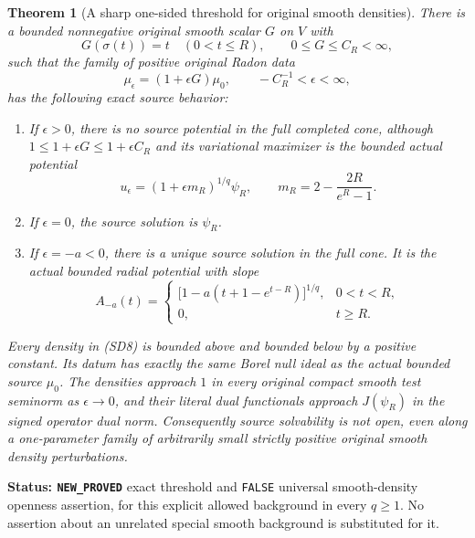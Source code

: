\documentclass[11pt,a4paper]{article}
\numberwithin{equation}{section}
\newtheorem{theorem}{Theorem}[section]
\theoremstyle{definition}
\theoremstyle{remark}
\begin{document}
\begin{theorem}[A sharp one-sided threshold for original smooth densities]
\label{thm:r12-smooth-density-one-sided-threshold}
There is a bounded nonnegative original smooth scalar
$G$ on $V$ with
\[
                 G(\sigma(t))=t\quad(0<t\le R),
                        \qquad 0\le G\le C_R<\infty,
 \tag{SD7}
\]
such that the family of positive original Radon data
\[
                       \mu_\epsilon=(1+\epsilon G)\mu_0,
                   \qquad -C_R^{-1}<\epsilon<\infty,
 \tag{SD8}
\]
has the following exact source behavior:
\begin{enumerate}
\item If $\epsilon>0$, there is no source potential in
the full completed cone, although $1\le1+\epsilon G
\le1+\epsilon C_R$ and its variational maximizer is
the bounded actual potential
\[
 u_\epsilon=(1+\epsilon m_R)^{1/q}\psi_R,
         \qquad m_R=2-\frac{2R}{e^R-1}.
 \tag{SD9}
\]
\item If $\epsilon=0$, the source solution is $\psi_R$.
\item If $\epsilon=-a<0$, there is a unique source
solution in the full cone.  It is the actual bounded
radial potential with slope
\[
 A_{-a}(t)=
 \begin{cases}
 \bigl[1-a(t+1-e^{t-R})\bigr]^{1/q},&0<t<R,\\
 0,&t\ge R.
 \end{cases}
 \tag{SD10}
\]
\end{enumerate}
Every density in \textup{(SD8)} is bounded above and
bounded below by a positive constant.  Its datum has
exactly the same Borel null ideal as the actual bounded
source $\mu_0$.  The densities approach $1$ in every
original compact smooth test seminorm as
$\epsilon\to0$, and their literal dual functionals
approach $J(\psi_R)$ in the signed operator dual norm.
Consequently source solvability is not open, even
along a one-parameter family of arbitrarily small
strictly positive original smooth density perturbations.
\end{theorem}

\noindent\textbf{Status: \texttt{NEW\_PROVED}} exact
threshold and \texttt{FALSE} universal smooth-density
openness assertion, for this explicit allowed background
in every $q\ge1$.  No assertion about an unrelated
special smooth background is substituted for it.
\end{document}
